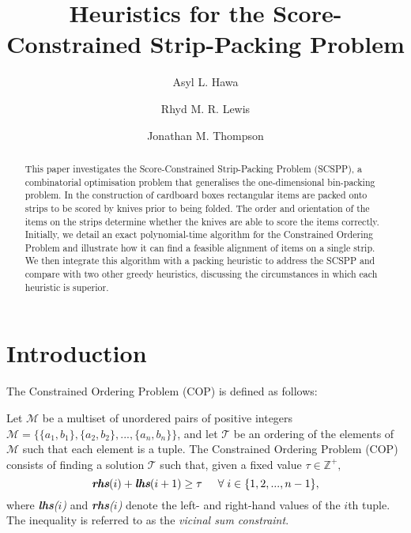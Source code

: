 \documentclass[oribibl]{llncs}
\begin{document}
	
\title{Heuristics for the Score-Constrained Strip-Packing Problem}
\author{Asyl L. Hawa \and Rhyd M. R. Lewis \and Jonathan M. Thompson}
\maketitle

\begin{abstract}
	This paper investigates the Score-Constrained Strip-Packing Problem (SCSPP), a combinatorial optimisation problem that generalises the one-dimensional bin-packing problem. In the construction of cardboard boxes rectangular items are packed onto strips to be scored by knives prior to being folded. The order and orientation of the items on the strips determine whether the knives are able to score the items correctly. Initially, we detail an exact polynomial-time algorithm for the Constrained Ordering Problem and illustrate how it can find a feasible alignment of items on a single strip. We then integrate this algorithm with a packing heuristic to address the SCSPP and compare with two other greedy heuristics, discussing the circumstances in which each heuristic is superior.
\end{abstract}

\section{Introduction}
\label{sec:intro}
The Constrained Ordering Problem (COP) is defined as follows:

\begin{definition}
	\label{defn:cop}
	Let $\mathcal{M}$ be a multiset of unordered pairs of positive integers $\mathcal{M} = \{\{a_1, b_1\}, \{a_2,b_2\},...,\{a_n,b_n\}\}$, and let $\mathcal{T}$ be an ordering of the elements of $\mathcal{M}$ such that each element is a tuple. The Constrained Ordering Problem (COP) consists of finding a solution $\mathcal{T}$ such that, given a fixed value $\tau \in \mathbb{Z}^{+},$
	\begin{equation}
		\label{eqn:vsc}
		\emph{\textbf{rhs}}(i) + \emph{\textbf{lhs}}(i+1) \geq \tau \hspace{5mm} \forall \hspace{1mm} i \in \{1,2,..., n-1\},
	\end{equation}
	where \emph{\textbf{lhs}($i$)} and \emph{\textbf{rhs}($i$)} denote the left- and right-hand values of the $i$th tuple. The inequality is referred to as the \emph{vicinal sum constraint}.
\end{definition}
\end{document}

